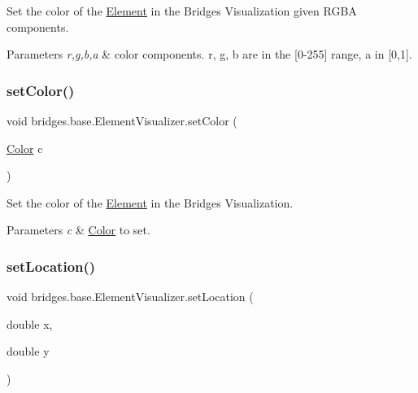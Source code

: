 Set the color of the \mbox{\hyperlink{classbridges_1_1base_1_1_element}{Element}} in the Bridges Visualization given R\+G\+BA components. 


\begin{DoxyParams}{Parameters}
{\em r,g,b,a} & color components. r, g, b are in the \mbox{[}0-\/255\mbox{]} range, a in \mbox{[}0,1\mbox{]}. \\
\hline
\end{DoxyParams}
\mbox{\label{classbridges_1_1base_1_1_element_visualizer_a33172ab908f3b6f9740727b0bfe91565}} 
\subsubsection{\texorpdfstring{set\+Color()}{setColor()}\hspace{0.1cm}{\footnotesize\ttfamily [3/3]}}
{\footnotesize\ttfamily void bridges.\+base.\+Element\+Visualizer.\+set\+Color (\begin{DoxyParamCaption}\item[{\mbox{\hyperlink{classbridges_1_1base_1_1_color}{Color}}}]{c }\end{DoxyParamCaption})}



Set the color of the \mbox{\hyperlink{classbridges_1_1base_1_1_element}{Element}} in the Bridges Visualization. 


\begin{DoxyParams}{Parameters}
{\em c} & \mbox{\hyperlink{classbridges_1_1base_1_1_color}{Color}} to set. \\
\hline
\end{DoxyParams}
\mbox{\label{classbridges_1_1base_1_1_element_visualizer_a04f3416447f2042de7cd21ce5b6a0598}} 
\subsubsection{\texorpdfstring{set\+Location()}{setLocation()}}
{\footnotesize\ttfamily void bridges.\+base.\+Element\+Visualizer.\+set\+Location (\begin{DoxyParamCaption}\item[{double}]{x,  }\item[{double}]{y }\end{DoxyParamCaption})}



